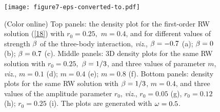 \documentclass[preprintnumbers]{revtex4}
\begin{document}
\begin{figure}[tbp]
\centerline{\texttt{[image: figure7-eps-converted-to.pdf]}}
\caption{(Color online) Top panels: the density plot for the first-order RW
solution (\protect\ref{18}) with $r_{0}=0.25,$ $m=0.4$, and for different
values of strength $\protect\beta $ of the three-body interaction, \textit{%
viz}., $\protect\beta =-0.7$ (a); $\protect\beta =0$ (b); $\protect\beta %
=0.7 $ (c). Middle panels: 3D density plots for the same RW solution with $%
r_{0}=0.25,$ $\protect\beta =1/3$, and three values of parameter $m$,
\textit{viz}., $m=0.1$ (d); $m=0.4$ (e); $m=0.8$ (f). Bottom panels: density
plots for the same RW solution with $\protect\beta =1/3$, $m=0.4$, and three
values of the amplitude parameter $r_{0}$, \textit{viz}., $r_{0}=0.05$ (g), $%
r_{0}=0.12$ (h); $r_{0}=0.25$ (i). The plots are generated with $\protect%
\omega =0.5$.}
\label{fig8}
\end{figure}
\end{document}
